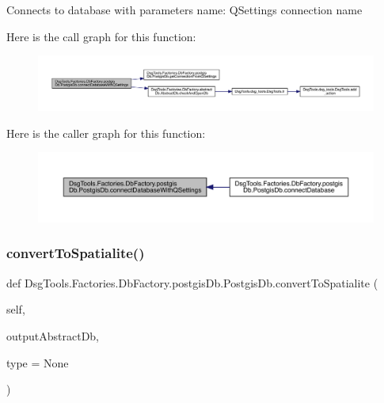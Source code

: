 \begin{DoxyVerb}Connects to database with parameters
name: QSettings connection name
\end{DoxyVerb}
 Here is the call graph for this function\+:
\nopagebreak
\begin{figure}[H]
\begin{center}
\leavevmode
\includegraphics[width=350pt]{class_dsg_tools_1_1_factories_1_1_db_factory_1_1postgis_db_1_1_postgis_db_a122957ae0b6aae812ae0b7be9372cb52_cgraph}
\end{center}
\end{figure}
Here is the caller graph for this function\+:
\nopagebreak
\begin{figure}[H]
\begin{center}
\leavevmode
\includegraphics[width=350pt]{class_dsg_tools_1_1_factories_1_1_db_factory_1_1postgis_db_1_1_postgis_db_a122957ae0b6aae812ae0b7be9372cb52_icgraph}
\end{center}
\end{figure}
\mbox{\label{class_dsg_tools_1_1_factories_1_1_db_factory_1_1postgis_db_1_1_postgis_db_ac900af7485f736aa0337be6b7e758ef0}} 
\subsubsection{\texorpdfstring{convert\+To\+Spatialite()}{convertToSpatialite()}}
{\footnotesize\ttfamily def Dsg\+Tools.\+Factories.\+Db\+Factory.\+postgis\+Db.\+Postgis\+Db.\+convert\+To\+Spatialite (\begin{DoxyParamCaption}\item[{}]{self,  }\item[{}]{output\+Abstract\+Db,  }\item[{}]{type = {\ttfamily None} }\end{DoxyParamCaption})}

